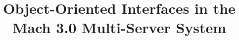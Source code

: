 \pagestyle{empty}

\setlength{\textheight}{8.75in}
\setlength{\columnsep}{2.0pc}
\setlength{\textwidth}{6.8in}
\setlength{\footheight}{0.0in}
\setlength{\topmargin}{0.0in}
\setlength{\headheight}{0.0in}
\setlength{\headsep}{0.0in}
\setlength{\oddsidemargin}{-.19in}
\setlength{\parindent}{1pc}


\makeatletter
\def\@normalsize{\@setsize\normalsize{12pt}\xpt\@xpt
\abovedisplayskip 10pt plus2pt minus5pt\belowdisplayskip \abovedisplayskip
\abovedisplayshortskip \z@ plus3pt\belowdisplayshortskip 6pt plus3pt
minus3pt\let\@listi\@listI} 

\def\subsize{\@setsize\subsize{12pt}\xipt\@xipt}

\def\section{\@startsection {section}{1}{\z@}{24pt plus 2pt minus 2pt}
{12pt plus 2pt minus 2pt}{\large\bf}}

\def\subsection{\@startsection {subsection}{2}{\z@}{12pt plus 2pt minus 2pt}
{12pt plus 2pt minus 2pt}{\subsize\bf}}
\makeatother



\date{}

\title{\Large\bf Object-Oriented Interfaces in the Mach 3.0 Multi-Server
System}

 
